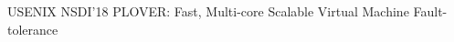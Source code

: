 \cvpub
{USENIX NSDI'18} %
{PLOVER: Fast, Multi-core Scalable Virtual Machine Fault-tolerance} %
{} %
{} %
{ %
}
